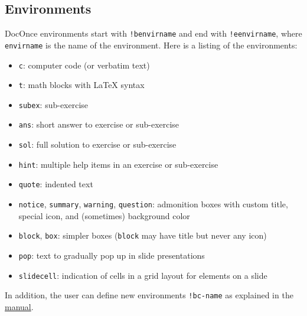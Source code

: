 \documentclass[%
oneside,                 %
final,                   %
10pt]{article}
\newcounter{doconce:movie:counter}
\begin{document}
\subsection{Environments}
DocOnce environments start with \Verb?!benvirname? and end with \Verb?!eenvirname?,
where \texttt{envirname} is the name of the environment. Here is a listing of
the environments:
\begin{itemize}
 \item \texttt{c}: computer code (or verbatim text)
 \item \texttt{t}: math blocks with {\LaTeX} syntax
 \item \texttt{subex}: sub-exercise
 \item \texttt{ans}: short answer to exercise or sub-exercise
 \item \texttt{sol}: full solution to exercise or sub-exercise
 \item \texttt{hint}: multiple help items in an exercise or sub-exercise
 \item \texttt{quote}: indented text
 \item \texttt{notice}, \texttt{summary}, \texttt{warning}, \texttt{question}: admonition boxes with
    custom title, special icon, and (sometimes) background color
 \item \texttt{block}, \texttt{box}: simpler boxes (\texttt{block} may have title but never any icon)
 \item \texttt{pop}: text to gradually pop up in slide presentations
 \item \texttt{slidecell}: indication of cells in a grid layout for elements on a
   slide
\end{itemize}
\noindent
In addition, the user can define new environments \Verb?!bc-name? as
explained in the \href{{http://doconce.github.io/doconce/doc/pub/manual/manual.html#manual:userdef:envir}}{manual}.
\end{document}
